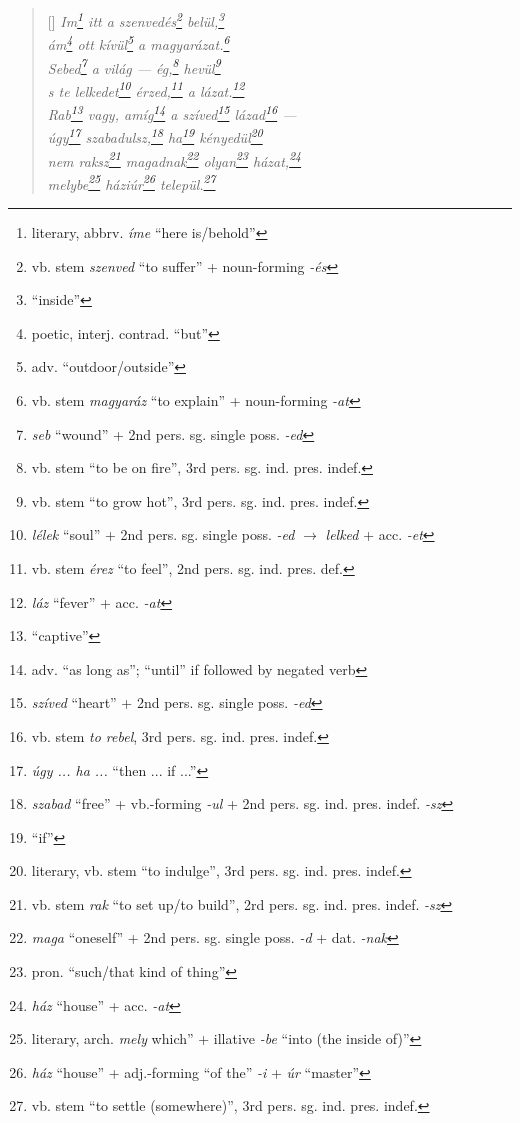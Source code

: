 \documentclass[a4paper,12pt,twoside,final]{book}
\begin{document}
\begin{verse}[\versewidth]
  \it
  Im\footnote{literary, abbrv. \emph{íme} ``here is/behold''}
  itt a szenvedés\footnote{vb. stem \emph{szenved} ``to suffer''
  + noun-forming \emph{-és}} belül,\footnote{``inside''} \\
  ám\footnote{poetic, interj. contrad. ``but''} ott
  kívül\footnote{adv. ``outdoor/outside''} a
  magyarázat.\footnote{vb. stem \emph{magyaráz} ``to explain'' +
  noun-forming \emph{-at}} \\
  Sebed\footnote{\emph{seb} ``wound'' + 2nd
  pers. sg. single poss. \emph{-ed}} a világ --- ég,\footnote{vb. stem
  ``to be on fire'', 3rd pers. sg. ind. pres. indef.}
  hevül\footnote{vb. stem ``to grow hot'', 3rd
  pers. sg. ind. pres. indef.} \\
  s te lelkedet\footnote{\emph{lélek} ``soul'' + 2nd
  pers. sg. single poss. \emph{-ed} $\rightarrow$ \emph{lelked} +
  acc. \emph{-et}} érzed,\footnote{vb. stem \emph{érez} ``to feel'', 2nd
  pers. sg. ind. pres. def.} a lázat.\footnote{\emph{láz} ``fever'' +
  acc. \emph{-at}} \\
  Rab\footnote{``captive''} vagy, amíg\footnote{adv. ``as long as'';
  ``until'' if followed by negated verb} a
  szíved\footnote{\emph{szíved} ``heart'' + 2nd pers. sg. single
  poss. \emph{-ed}} lázad\footnote{vb. stem \emph{to rebel}, 3rd
  pers. sg. ind. pres. indef.} --- \\
  úgy\footnote{\emph{úgy ... ha ...} ``then ... if ...''}
  szabadulsz,\footnote{\emph{szabad} ``free'' + vb.-forming \emph{-ul}
  + 2nd pers. sg. ind. pres. indef. \emph{-sz}} ha\footnote{``if''}
  kényedül\footnote{literary, vb. stem ``to indulge'', 3rd
  pers. sg. ind. pres. indef.} \\
  nem raksz\footnote{vb. stem \emph{rak} ``to set up/to build'', 2rd
  pers. sg. ind. pres. indef. \emph{-sz}}
  magadnak\footnote{\emph{maga} ``oneself'' + 2nd pers. sg. single
  poss. \emph{-d} + dat. \emph{-nak}}
  olyan\footnote{pron. ``such/that kind of thing''}
  házat,\footnote{\emph{ház} ``house'' + acc. \emph{-at}} \\
  melybe\footnote{literary, arch. \emph{mely}
   which'' + illative \emph{-be} ``into (the inside of)''}
  háziúr\footnote{\emph{ház} ``house'' + adj.-forming ``of the''
  \emph{-i} + \emph{úr} ``master''} települ.\footnote{vb. stem ``to
  settle (somewhere)'', 3rd pers. sg. ind. pres. indef.}
\end{verse}

\newpage
\end{document}
